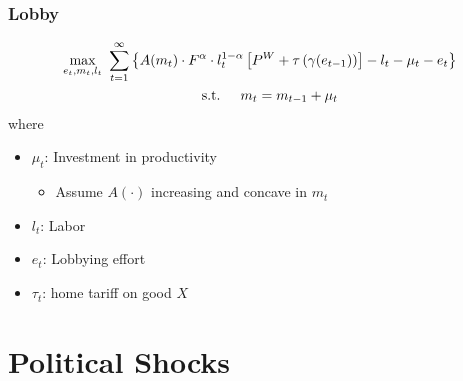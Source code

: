 \documentclass[handout]{beamer}
\newcommand{\ga}{\gamma}
\begin{document}
\begin{frame}
\frametitle{Lobby}
\pause
\begin{multline*}
  \max_{e_t,m_t,l_t} \ \sum_{t=1}^\infty \left\{ A(m_t) \cdot F^\alpha \cdot l_t^{1-\alpha}\left[P^W + \tau\left(\gamma(e_{t-1})\right)\right] - l_t - \mu_t - e_t \right\} \\ \hskip.2in \text{s.t.} \hskip.2in m_t = m_{t-1} + \mu_{t} %
\end{multline*}
\pause
where 

\pause
\begin{itemize}[<+->]
	\item $\mu_t$: Investment in productivity
		\begin{itemize}
			\item Assume $A(\cdot)$ increasing and concave in $m_t$
		\end{itemize}
	\item $l_t$: Labor
	\item $e_t$: Lobbying effort
	\item $\tau_t$: home tariff on good $X$
\end{itemize}


\end{frame}


\section{Political Shocks}
\subsection{}
\end{document}

